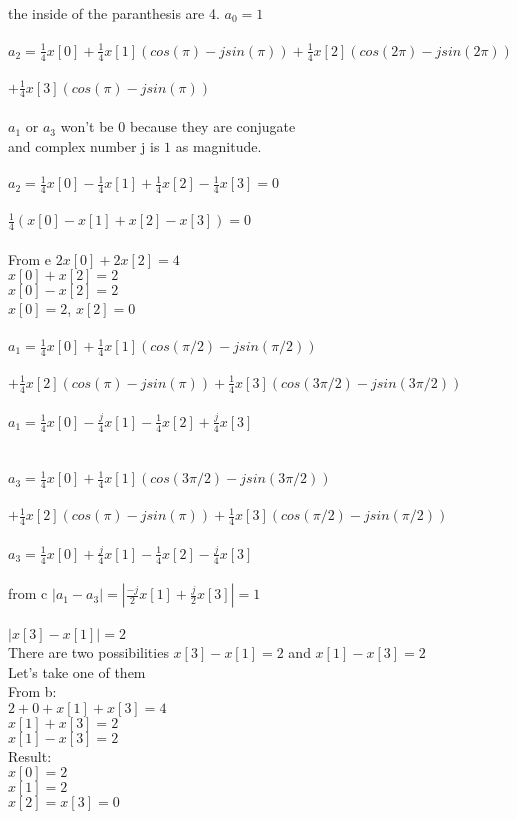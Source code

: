 \documentclass[10pt,a4paper, margin=1in]{article}
\begin{document}
\begin{enumerate}
the inside of the paranthesis are 4. $a_0=1$\\ \\
$a_2=\frac{1}{4}x[0]+\frac{1}{4}x[1](cos(\pi)-jsin(\pi))+\frac{1}{4}x[2](cos(2\pi)-jsin(2\pi))$\\ \\$+\frac{1}{4}x[3](cos(\pi)-jsin(\pi))$\\ \\
$a_1$ or $a_3$ won't be $0$ because they are conjugate \\
and complex number j is $1$ as magnitude.\\ \\
$a_2=\frac{1}{4}x[0]-\frac{1}{4}x[1]+\frac{1}{4}x[2]-\frac{1}{4}x[3]=0$\\ \\
$\frac{1}{4}(x[0]-x[1]+x[2]-x[3])=0$\\ \\
From e $2x[0]+2x[2]=4$\\
$x[0]+x[2]=2$\\
$x[0]-x[2]=2$\\
$x[0]=2$, $x[2]=0$\\ \\
$a_1=\frac{1}{4}x[0]+\frac{1}{4}x[1](cos(\pi/2)-jsin(\pi/2))$\\ \\
$+\frac{1}{4}x[2](cos(\pi)-jsin(\pi))+\frac{1}{4}x[3](cos(3\pi/2)-jsin(3\pi/2))$\\ \\
$a_1=\frac{1}{4}x[0]-\frac{j}{4}x[1]-\frac{1}{4}x[2]+\frac{j}{4}x[3]$\\ \\ \\
$a_3=\frac{1}{4}x[0]+\frac{1}{4}x[1](cos(3\pi/2)-jsin(3\pi/2))$\\ \\
$+\frac{1}{4}x[2](cos(\pi)-jsin(\pi))+\frac{1}{4}x[3](cos(\pi/2)-jsin(\pi/2))$\\ \\
$a_3=\frac{1}{4}x[0]+\frac{j}{4}x[1]-\frac{1}{4}x[2]-\frac{j}{4}x[3]$\\ \\
from c $|a_1-a_3|=|\frac{-j}{2}x[1]+\frac{j}{2}x[3]|=1$\\ \\
$|x[3]-x[1]|=2$\\
There are two possibilities $x[3]-x[1]=2$ and $x[1]-x[3]=2$ \\
Let's take one of them \\
From b:\\
$2+0+x[1]+x[3]=4$\\
$x[1]+x[3]=2$\\
$x[1]-x[3]=2$\\
Result:\\
$x[0]=2$\\
$x[1]=2$\\
$x[2]=x[3]=0$\\ \\ 














\end{enumerate}
\end{document}
